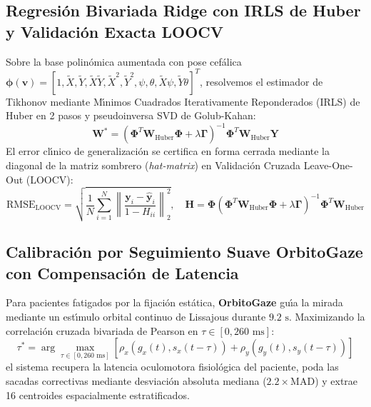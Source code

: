 \documentclass[twocolumn,10pt]{article}
\begin{document}
\subsection{Regresi\'on Bivariada Ridge con IRLS de Huber y Validaci\'on Exacta LOOCV}
Sobre la base polin\'omica aumentada con pose cef\'alica $\boldsymbol{\phi}(\mathbf{v}) = [1, \tilde{X}, \tilde{Y}, \tilde{X}\tilde{Y}, \tilde{X}^2, \tilde{Y}^2, \psi, \theta, \tilde{X}\psi, \tilde{Y}\theta]^T$, resolvemos el estimador de Tikhonov mediante M\'{\i}nimos Cuadrados Iterativamente Reponderados (IRLS) de Huber en 2 pasos y pseudoinversa SVD de Golub-Kahan:
\begin{equation}
\mathbf{W}^* = \left(\mathbf{\Phi}^T \mathbf{W}_{\text{Huber}} \mathbf{\Phi} + \lambda \mathbf{\Gamma}\right)^{-1} \mathbf{\Phi}^T \mathbf{W}_{\text{Huber}} \mathbf{Y}
\end{equation}
El error cl\'{\i}nico de generalizaci\'on se certifica en forma cerrada mediante la diagonal de la matriz sombrero (\textit{hat-matrix}) en Validaci\'on Cruzada Leave-One-Out (LOOCV):
\begin{equation}
\text{RMSE}_{\text{LOOCV}} = \sqrt{\frac{1}{N}\sum_{i=1}^{N} \left\|\frac{\mathbf{y}_i - \hat{\mathbf{y}}_i}{1 - H_{ii}}\right\|_2^2}, \quad \mathbf{H} = \mathbf{\Phi}\left(\mathbf{\Phi}^T \mathbf{W}_{\text{Huber}} \mathbf{\Phi} + \lambda\mathbf{\Gamma}\right)^{-1}\mathbf{\Phi}^T \mathbf{W}_{\text{Huber}}
\end{equation}

\subsection{Calibraci\'on por Seguimiento Suave OrbitoGaze con Compensaci\'on de Latencia}
Para pacientes fatigados por la fijaci\'on est\'atica, \textbf{OrbitoGaze} gu\'{\i}a la mirada mediante un est\'{\i}mulo orbital continuo de Lissajous durante $9.2\text{ s}$. Maximizando la correlaci\'on cruzada bivariada de Pearson en $\tau \in [0, 260\text{ ms}]$:
\begin{equation}
\tau^* = \arg\max_{\tau \in [0, 260\text{ ms}]} \left[\rho_x\!\left(g_x(t), s_x(t - \tau)\right) + \rho_y\!\left(g_y(t), s_y(t - \tau)\right)\right]
\end{equation}
el sistema recupera la latencia oculomotora fisiol\'ogica del paciente, poda las sacadas correctivas mediante desviaci\'on absoluta mediana ($2.2\times\text{MAD}$) y extrae 16 centroides espacialmente estratificados.
\end{document}
